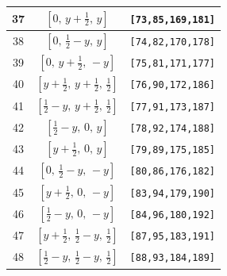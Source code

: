 \documentclass[fleqn,8pt]{jsarticle}
\begin{document}
\begin{longtable}{ccc}
37 & $\left[ 0,\, y + \frac{1}{2},\, y \right]$ & {\tt [73,85,169,181]} \\ \hline
38 & $\left[ 0,\, \frac{1}{2} - y,\, y \right]$ & {\tt [74,82,170,178]} \\ \hline
39 & $\left[ 0,\, y + \frac{1}{2},\, - y \right]$ & {\tt [75,81,171,177]} \\ \hline
40 & $\left[ y + \frac{1}{2},\, y + \frac{1}{2},\, \frac{1}{2} \right]$ & {\tt [76,90,172,186]} \\ \hline
41 & $\left[ \frac{1}{2} - y,\, y + \frac{1}{2},\, \frac{1}{2} \right]$ & {\tt [77,91,173,187]} \\ \hline
42 & $\left[ \frac{1}{2} - y,\, 0,\, y \right]$ & {\tt [78,92,174,188]} \\ \hline
43 & $\left[ y + \frac{1}{2},\, 0,\, y \right]$ & {\tt [79,89,175,185]} \\ \hline
44 & $\left[ 0,\, \frac{1}{2} - y,\, - y \right]$ & {\tt [80,86,176,182]} \\ \hline
45 & $\left[ y + \frac{1}{2},\, 0,\, - y \right]$ & {\tt [83,94,179,190]} \\ \hline
46 & $\left[ \frac{1}{2} - y,\, 0,\, - y \right]$ & {\tt [84,96,180,192]} \\ \hline
47 & $\left[ y + \frac{1}{2},\, \frac{1}{2} - y,\, \frac{1}{2} \right]$ & {\tt [87,95,183,191]} \\ \hline
48 & $\left[ \frac{1}{2} - y,\, \frac{1}{2} - y,\, \frac{1}{2} \right]$ & {\tt [88,93,184,189]} \\
\end{longtable}
\renewcommand{\arraystretch}{1.2}
\end{document}
